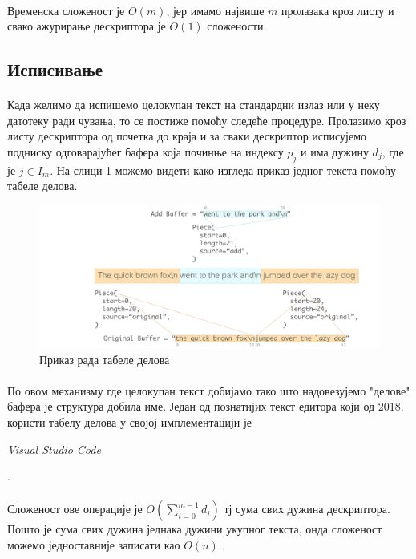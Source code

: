\documentclass[12pt,oneside]{memoir}
\begin{document}
\paragraph{}
Временска сложеност је \(O(m)\), јер имамо највише \(m\) пролазака кроз листу и свако
ажурирање дескриптора је \(O(1)\) сложености.

\subsection{Исписивање}
\paragraph{}
Када желимо да испишемо целокупан текст на стандардни излаз или у неку датотеку ради чувања,
то се постиже помоћу следеће процедуре. Пролазимо кроз листу дескриптора од почетка до краја
и за сваки дескриптор исписујемо подниску одговарајућег бафера која починње на индексу 
\(p_j\) и има дужину \(d_j\), где је \(j \in I_m\). На слици \ref{fig:piece_table} можемо
видети како изгледа приказ једног текста помоћу табеле делова.

\begin{figure}[!ht]
	\centering
	\includegraphics[width=1.0\textwidth]{images/piece_table.png}
	\caption{Приказ рада табеле делова}
	\label{fig:piece_table}
\end{figure}

\paragraph{}
По овом механизму где целокупан текст добијамо тако што надовезујемо "делове" бафера је 
структура добила име. Један од познатијих текст едитора који од 2018. користи табелу делова у својој
имплементацији је \begin{latinica}\textit{Visual Studio Code}\end{latinica} \cite{VSC}.

\paragraph{}
Сложеност ове операције је \(O(\sum_{i=0}^{m-1} d_i)\) тј сума
свих дужина дескриптора. Пошто је сума свих дужина једнака дужини укупног текста, онда
сложеност можемо једноставније записати као \(O(n)\).
\end{document}
